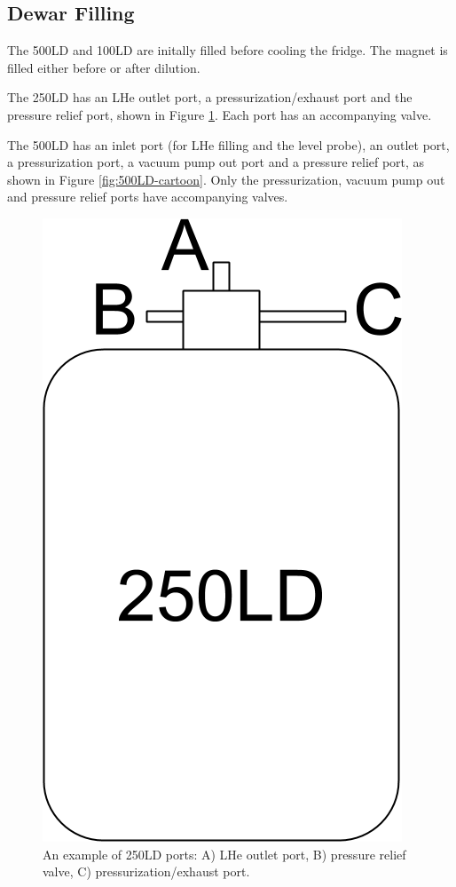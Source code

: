 \subsection{Dewar Filling}
The 500LD and 100LD are initally filled before cooling the fridge.  The magnet is filled either before or after dilution.

The 250LD has an LHe outlet port, a pressurization/exhaust port and the pressure relief port, shown in Figure \ref{fig:250LD-cartoon}.  Each port has an accompanying valve.

The 500LD has an inlet port (for LHe filling and the level probe), an outlet port, a pressurization port, a vacuum pump out port and a pressure relief port, as shown in Figure \ref{fig:500LD-cartoon}.  Only the pressurization, vacuum pump out and pressure relief ports have accompanying valves.


\begin{figure}[!htbp]
\centering
 \includegraphics[width=.25\textwidth]{./img/250LD-cartoon.png}
 \caption{An example of 250LD ports: A) LHe outlet port, B) pressure relief valve, C) pressurization/exhaust port.}
 \label{fig:250LD-cartoon}
\end{figure}



